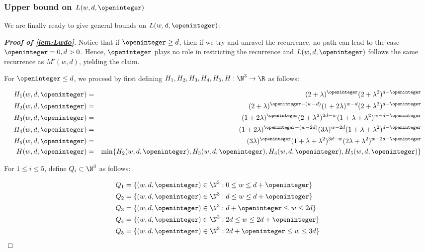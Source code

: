 \subsubsection{Upper bound on $L(w, d, \openinteger)$}

We are finally ready to give general bounds on $L(w, d, \openinteger)$:

\begin{proof}[\textbf{Proof of \cref{lem:Lwdo}}]

Notice that if $\openinteger \ge d$, then if we try and unravel the recurrence, no path can lead to the case $\openinteger = 0, d > 0$. Hence, $\openinteger$ plays no role in restricting the recurrence and $L(w, d, \openinteger)$ follows the same recurrence as $M'(w, d)$, yielding the claim.

For $\openinteger \le d$, we proceed by first defining $H_1, H_2, H_3, H_4, H_5, H: \N^3\rightarrow \R$ as follows:

\begin{eqnarray*}
H_1(w, d, \openinteger) & = & (2+\lambda)^{\openinteger}(2+\lambda^2)^{d-\openinteger}\\
H_2(w, d, \openinteger) & = & (2+\lambda)^{\openinteger - (w-d)}(1+2\lambda)^{w-d}(2+\lambda^2)^{d-\openinteger}\\
H_3(w, d, \openinteger) & = & (1+2\lambda)^{\openinteger}(2+\lambda^2)^{2d-w}(1+\lambda+\lambda^2)^{w-d-\openinteger}\\
H_4(w, d, \openinteger) & = & (1+2\lambda)^{\openinteger - (w-2d)}(3\lambda)^{w-2d}(1+\lambda+\lambda^2)^{d-\openinteger}\\
H_5(w, d, \openinteger) & = & (3\lambda)^{\openinteger}(1+\lambda+\lambda^2)^{3d-w}(2\lambda + \lambda^2)^{w-2d-\openinteger}\\
H(w, d, \openinteger) & = & \min\{H_2(w, d, \openinteger), H_3(w, d, \openinteger), H_4(w, d, \openinteger), H_5(w, d, \openinteger)\}\\
\end{eqnarray*}

For $1\le i\le 5$, define $Q_i\subset \N^3$ as follows:

\begin{align*}
Q_1 & = \{(w, d, \openinteger)\in \N^3: 0 \le w \le d + \openinteger\}\\
Q_2 & = \{(w, d, \openinteger)\in \N^3: d \le w \le d + \openinteger\}\\
Q_3 & = \{(w, d, \openinteger)\in \N^3: d + \openinteger \le w \le 2d\}\\
Q_4 & = \{(w, d, \openinteger)\in \N^3: 2d \le w \le 2d + \openinteger\}\\
Q_5 & = \{(w, d, \openinteger)\in \N^3: 2d + \openinteger \le w \le 3d\}\\
\end{align*}


\end{proof}

